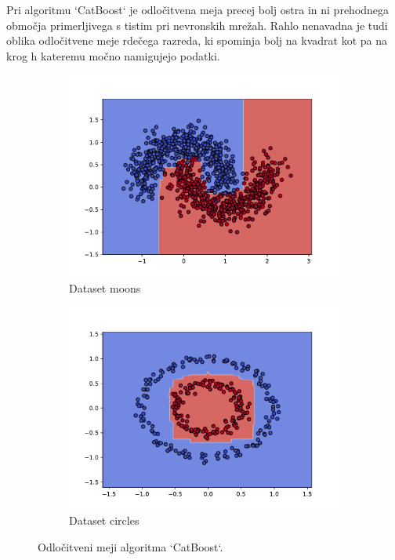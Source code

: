 \documentclass{article}
\begin{document}
Pri algoritmu `CatBoost` je odločitvena meja precej bolj ostra in ni prehodnega območja primerljivega s tistim pri nevronskih mrežah. Rahlo nenavadna je tudi oblika odločitvene meje rdečega razreda, ki spominja bolj na kvadrat kot pa na krog h kateremu močno namigujejo podatki. 
\begin{figure}[H]
    \centering
    \begin{subfigure}{0.48\textwidth}
        \centering
        \includegraphics[width=\linewidth]{moonscb.pdf}
        \caption{Dataset moons}
    \end{subfigure}\hfill
    \begin{subfigure}{0.48\textwidth}
        \centering
        \includegraphics[width=\linewidth]{circlescb.pdf}
        \caption{Dataset circles}
    \end{subfigure}
    \caption{Odločitveni meji algoritma `CatBoost`.}
\end{figure}
\end{document}
